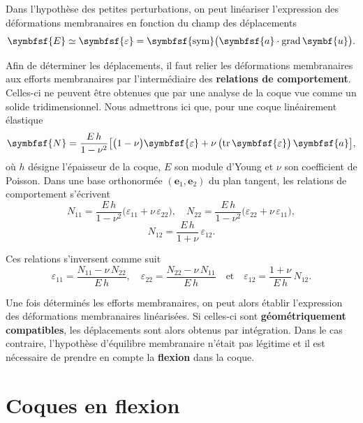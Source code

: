 \documentclass[
  a4paper,
  DIV=11,
  numbers=noendperiod]{scrreprt}
\newcommand{\grad}{\operatorname{grad}}
\newcommand{\sym}{\operatorname{\symbfsf{sym}}}
\newcommand{\tens}[1]{\symbfsf{#1}}
\newcommand{\tr}{\operatorname{tr}}
\renewcommand{\vec}[1]{\symbf{#1}}
\begin{document}
Dans l'hypothèse des petites perturbations, on peut linéariser
l'expression des déformations membranaires en fonction du champ des
déplacements \[
\tens{E} \simeq \tens{\varepsilon} = \sym \bigl( \tens{a} \cdot \grad \vec{u} \bigr).
\]

Afin de déterminer les déplacements, il faut relier les déformations
membranaires aux efforts membranaires par l'intermédiaire des
\textbf{relations de comportement}. Celles-ci ne peuvent être obtenues
que par une analyse de la coque vue comme un solide tridimensionnel.
Nous admettrons ici que, pour une coque linéairement élastique \[
\tens{N} = \frac{E \, h}{1 - \nu^2} \bigl[ \bigl( 1 - \nu \bigr) \tens{\varepsilon} + \nu \, \bigl( \tr \tens{\varepsilon} \bigr) \, \tens{a} \bigr],
\] où \(h\) désigne l'épaisseur de la coque, \(E\) son module d'Young et
\(\nu\) son coefficient de Poisson. Dans une base orthonormée
\((\vec{e}_1, \vec{e}_2)\) du plan tangent, les relations de
comportement s'écrivent \[
N_{11} = \frac{E \, h}{1 - \nu^2} \bigl( \varepsilon_{11} + \nu \, \varepsilon_{22} \bigr), \quad N_{22} = \frac{E \, h}{1 - \nu^2} \bigl( \varepsilon_{22} + \nu \, \varepsilon_{11} \bigr),
\] \[
N_{12} = \frac{E \, h}{1 + \nu} \, \varepsilon_{12}.
\]

Ces relations s'inversent comme suit \[
\varepsilon_{11} = \frac{N_{11} - \nu \, N_{22}}{E \, h}, \quad \varepsilon_{22} = \frac{N_{22} - \nu \, N_{11}}{E \, h} \quad \text{et} \quad \varepsilon_{12} = \frac{1 + \nu}{E \, h} \, N_{12}.
\]

Une fois déterminés les efforts membranaires, on peut alors établir
l'expression des déformations membranaires linéarisées. Si celles-ci
sont \textbf{géométriquement compatibles}, les déplacements sont alors
obtenus par intégration. Dans le cas contraire, l'hypothèse d'équilibre
membranaire n'était pas légitime et il est nécessaire de prendre en
compte la \textbf{flexion} dans la coque.


\hypertarget{sec-20230411093311}{%
\chapter{Coques en flexion}\label{sec-20230411093311}}
\end{document}
